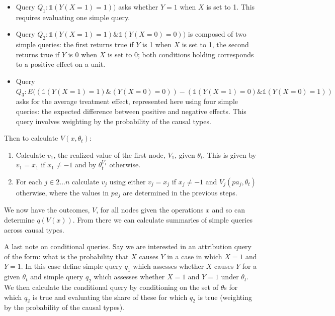 \documentclass[
  12pt,
]{book}
\providecommand{\tightlist}{%
  \setlength{\itemsep}{0pt}\setlength{\parskip}{0pt}}
\begin{document}
\begin{itemize}
\tightlist
\item
  Query \(Q_1:\mathbb{1}(Y(X=1)=1))\) asks whether \(Y=1\) when \(X\) is set to 1. This requires evaluating one simple query.
\item
  Query \(Q_2:\mathbb{1}(Y(X=1)=1) \& \mathbb{1}(Y(X=0)=0))\) is composed of two simple queries: the first returns true if \(Y\) is 1 when \(X\) is set to 1, the second returns true if \(Y\) is 0 when \(X\) is set to 0; both conditions holding corresponds to a positive effect on a unit.
\item
  Query \(Q_3:E((\mathbb{1}(Y(X=1)=1) \& (Y(X=0)=0)) - (\mathbb{1}(Y(X=1)=0) \& \mathbb{1}(Y(X=0)=1))\) asks for the average treatment effect, represented here using four simple queries: the expected difference between positive and negative effects. This query involves weighting by the probability of the causal types.
\end{itemize}

Then to calculate \(V(x, \theta_t)\):

\begin{enumerate}
\def\labelenumi{\arabic{enumi}.}
\tightlist
\item
  Calculate \(v_1\), the realized value of the first node, \(V_1\), given \(\theta_t\). This is given by \(v_1 = x_1\) if \(x_1 \neq -1\) and by \(\theta_t^{V_1}\) otherwise.
\item
  For each \(j \in 2...n\) calculate \(v_j\) using either \(v_j = x_j\) if \(x_j \neq -1\) and \(V_{j}(pa_j, \theta_t)\) otherwise, where the values in \(pa_j\) are determined in the previous steps.
\end{enumerate}

We now have the outcomes, \(V\), for all nodes given the operations \(x\) and so can determine \(q(V(x))\). From there we can calculate summaries of simple queries across causal types.

A last note on conditional queries. Say we are interested in an attribution query of the form: what is the probability that \(X\) causes \(Y\) in a case in which \(X=1\) and \(Y=1\). In this case define simple query \(q_1\) which assesses whether \(X\) causes \(Y\) for a given \(\theta_t\) and simple query \(q_2\) which assesses whether \(X=1\) and \(Y=1\) under \(\theta_t\). We then calculate the conditional query by conditioning on the set of \(\theta\)s for which \(q_2\) is true and evaluating the share of these for which \(q_2\) is true (weighting by the probability of the causal types).
\end{document}
